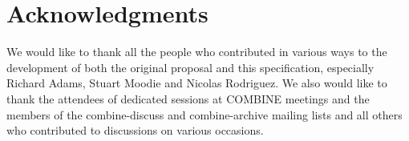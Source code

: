 
\section{Acknowledgments}
We would like to thank all the people who contributed in various ways to the development of both the original proposal and this specification, especially Richard Adams, Stuart Moodie and Nicolas Rodriguez. 
We also would like to thank the attendees of dedicated sessions at COMBINE meetings and the members of the \textsf{combine-discuss} and \textsf{combine-archive} mailing lists and all others who contributed to 
discussions on various occasions. 




